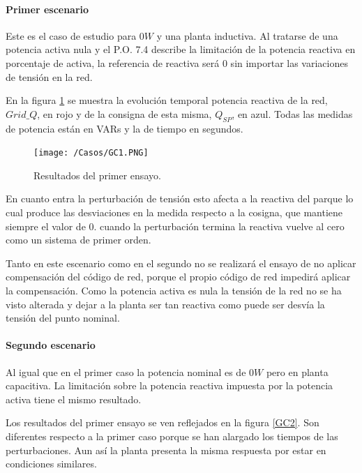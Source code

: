 \documentclass{book}
\begin{document}
	\paragraph{Primer escenario} 

Este es el caso de estudio para $0W$ y una planta inductiva. Al tratarse de una potencia activa nula y el P.O. 7.4 describe la limitaci\'on de la potencia reactiva en porcentaje de activa, la referencia de reactiva ser\'a 0 sin importar las variaciones de tensi\'on en la red. \par

En la figura \ref{GC1} se muestra la evoluci\'on temporal potencia reactiva de la red, $Grid\_Q$, en rojo y de la consigna de esta misma, $Q_{SP}$, en azul. Todas las medidas de potencia est\'an en VARs y la de tiempo en segundos.\par

\begin{figure}[h!]
\centering
\texttt{[image: /Casos/GC1.PNG]}
\caption{Resultados del primer ensayo. }
\label{GC1}
\end{figure} \par

En cuanto entra la perturbaci\'on de tensi\'on esto afecta a la reactiva del parque lo cual produce las desviaciones en la medida respecto a la cosigna, que mantiene siempre el valor de 0. cuando la perturbaci\'on termina la reactiva vuelve al cero como un sistema de primer orden. \par 

Tanto en este escenario como en el segundo no se realizar\'a el ensayo de no aplicar compensaci\'on del c\'odigo de red, porque el propio c\'odigo de red impedir\'a aplicar la compensaci\'on. Como la potencia activa es nula la tensi\'on de la red no se ha visto alterada y dejar a la planta ser tan reactiva como puede ser desv\'ia la tensi\'on del punto nominal. \par


	\paragraph{Segundo escenario}

Al igual que en el primer caso la potencia nominal es de $0W$ pero en planta capacitiva. La limitaci\'on sobre la potencia reactiva impuesta por la potencia activa tiene el mismo resultado. \par

Los resultados del primer ensayo se ven reflejados en la figura \ref{GC2}. Son diferentes respecto a la primer caso porque se han alargado los tiempos de las perturbaciones. Aun as\'i la planta presenta la misma respuesta por estar en condiciones similares. \par
\end{document}
